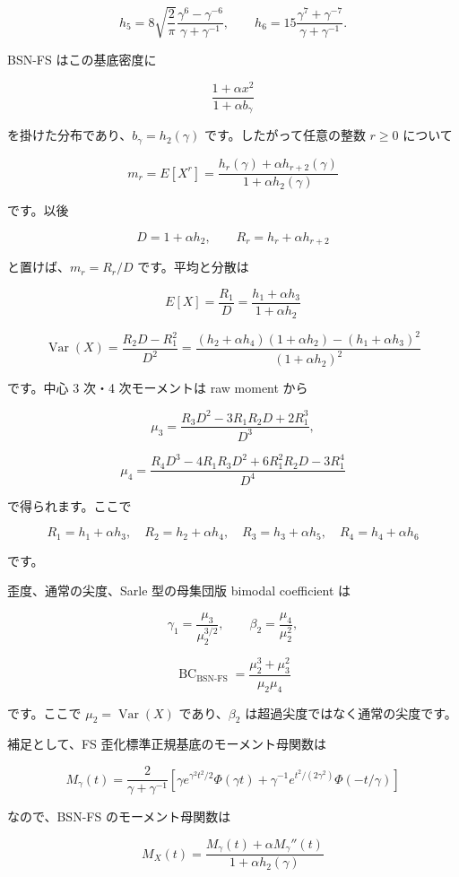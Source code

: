 \documentclass[
]{article}
\begin{document}
\[
h_5=8\sqrt{\frac2\pi}
\frac{\gamma^6-\gamma^{-6}}{\gamma+\gamma^{-1}},
\qquad
h_6=15\frac{\gamma^7+\gamma^{-7}}{\gamma+\gamma^{-1}}.
\]

BSN-FS はこの基底密度に

\[
\frac{1+\alpha x^2}{1+\alpha b_\gamma}
\]

を掛けた分布であり、\(b_\gamma=h_2(\gamma)\) です。したがって任意の整数
\(r\ge0\) について

\[
\boxed{
m_r=E[X^r]
=\frac{h_r(\gamma)+\alpha h_{r+2}(\gamma)}
{1+\alpha h_2(\gamma)}
}
\]

です。以後

\[
D=1+\alpha h_2,
\qquad
R_r=h_r+\alpha h_{r+2}
\]

と置けば、\(m_r=R_r/D\) です。平均と分散は

\[
\boxed{
E[X]=\frac{R_1}{D}
=\frac{h_1+\alpha h_3}{1+\alpha h_2}
}
\]

\[
\boxed{
\operatorname{Var}(X)
=\frac{R_2D-R_1^2}{D^2}
=
\frac{(h_2+\alpha h_4)(1+\alpha h_2)-(h_1+\alpha h_3)^2}
{(1+\alpha h_2)^2}
}
\]

です。中心 3 次・4 次モーメントは raw moment から

\[
\mu_3
=
\frac{R_3D^2-3R_1R_2D+2R_1^3}{D^3},
\]

\[
\mu_4
=
\frac{R_4D^3-4R_1R_3D^2+6R_1^2R_2D-3R_1^4}{D^4}
\]

で得られます。ここで

\[
R_1=h_1+\alpha h_3,\quad
R_2=h_2+\alpha h_4,\quad
R_3=h_3+\alpha h_5,\quad
R_4=h_4+\alpha h_6
\]

です。

歪度、通常の尖度、Sarle 型の母集団版 bimodal coefficient は

\[
\gamma_1=\frac{\mu_3}{\mu_2^{3/2}},
\qquad
\beta_2=\frac{\mu_4}{\mu_2^2},
\]

\[
\boxed{
\operatorname{BC}_{\mathrm{BSN\text{-}FS}}
=\frac{\mu_2^3+\mu_3^2}{\mu_2\mu_4}
}
\]

です。ここで \(\mu_2=\operatorname{Var}(X)\) であり、\(\beta_2\)
は超過尖度ではなく通常の尖度です。

補足として、FS 歪化標準正規基底のモーメント母関数は

\[
M_\gamma(t)
=
\frac{2}{\gamma+\gamma^{-1}}
\left[
\gamma e^{\gamma^2t^2/2}\Phi(\gamma t)
+
\gamma^{-1}e^{t^2/(2\gamma^2)}\Phi(-t/\gamma)
\right]
\]

なので、BSN-FS のモーメント母関数は

\[
\boxed{
M_X(t)=
\frac{M_\gamma(t)+\alpha M_\gamma''(t)}
{1+\alpha h_2(\gamma)}
}
\]
\end{document}
